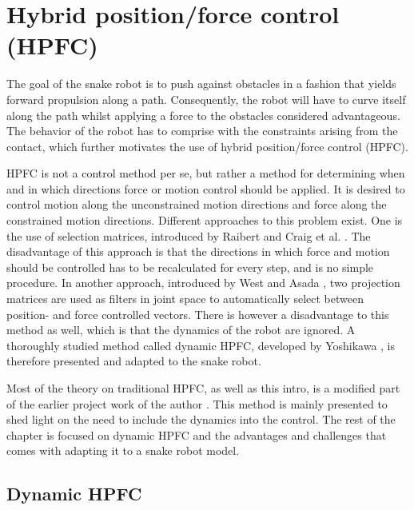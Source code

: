 \section{Hybrid position/force control (HPFC)}

The goal of the snake robot is to push against obstacles in a fashion that yields forward propulsion along a path. Consequently, the robot will have to curve itself along the path whilst applying a force to the obstacles considered advantageous. The behavior of the robot has to comprise with the constraints arising from the contact, which further motivates the use of hybrid position/force control (HPFC).

HPFC is not a control method per se, but rather a method for determining when and in which directions force or motion control should be applied. It is desired to control motion along the unconstrained motion directions and force along the constrained motion directions. Different approaches to this problem exist. One is the use of selection matrices, introduced by Raibert and Craig et al. \cite{raibert1981hybrid}. The disadvantage of this approach is that the directions in which force and motion should be controlled has to be recalculated for every step, and is no simple procedure. In another approach, introduced by West and Asada \cite{west1985method}, two projection matrices are used as filters in joint space to automatically select between position- and force controlled vectors. There is however a disadvantage to this method as well, which is that the dynamics of the robot are ignored. A thoroughly studied method called dynamic HPFC, developed by Yoshikawa \cite{yoshikawa1987dynamic}, is therefore presented and adapted to the snake robot.

Most of the theory on traditional HPFC, as well as this intro, is a modified part of the earlier project work of the author \cite{AtussaProsjektoppgp}. This method is mainly presented to shed light on the need to include the dynamics into the control. The rest of the chapter is focused on dynamic HPFC and the advantages and challenges that comes with adapting it to a snake robot model.



\subsection{Dynamic HPFC} \label{subsec:DHPFC}

